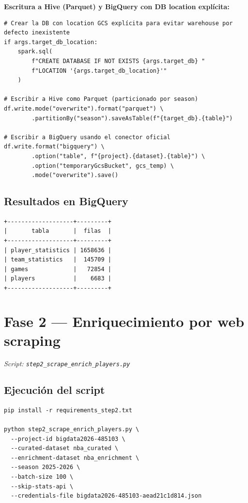 \documentclass[12pt, letterpaper]{article}
\begin{document}
\textbf{Escritura a Hive (Parquet) y BigQuery con DB location explícita:}

\begin{lstlisting}[style=codestyle, caption={Creación de DB Hive curada con LOCATION explícita y escritura Parquet + BigQuery}]
# Crear la DB con location GCS explícita para evitar warehouse por defecto inexistente
if args.target_db_location:
    spark.sql(
        f"CREATE DATABASE IF NOT EXISTS {args.target_db} "
        f"LOCATION '{args.target_db_location}'"
    )

# Escribir a Hive como Parquet (particionado por season)
df.write.mode("overwrite").format("parquet") \
        .partitionBy("season").saveAsTable(f"{target_db}.{table}")

# Escribir a BigQuery usando el conector oficial
df.write.format("bigquery") \
        .option("table", f"{project}.{dataset}.{table}") \
        .option("temporaryGcsBucket", gcs_temp) \
        .mode("overwrite").save()
\end{lstlisting}

\subsection{Resultados en BigQuery}

\begin{lstlisting}[style=outputstyle, caption={Evidencia --- conteo real de filas en \texttt{nba\_curated} (BigQuery)}]
+-------------------+---------+
|       tabla       |  filas  |
+-------------------+---------+
| player_statistics | 1658636 |
| team_statistics   |  145709 |
| games             |   72854 |
| players           |    6683 |
+-------------------+---------+
\end{lstlisting}

\section{Fase 2 — Enriquecimiento por web scraping}
\textit{Script: \texttt{step2\_scrape\_enrich\_players.py}}

\subsection{Ejecución del script}

\begin{lstlisting}[style=codestyle, caption={Ejecución del scraper con \texttt{--skip-stats-api} (tercera iteración, exitosa)}]
pip install -r requirements_step2.txt

python step2_scrape_enrich_players.py \
  --project-id bigdata2026-485103 \
  --curated-dataset nba_curated \
  --enrichment-dataset nba_enrichment \
  --season 2025-2026 \
  --batch-size 100 \
  --skip-stats-api \
  --credentials-file bigdata2026-485103-aead21c1d814.json
\end{lstlisting}
\end{document}
